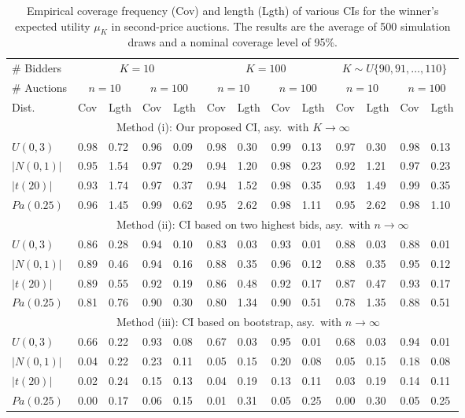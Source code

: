 \begin{table}[ht]
\centering
\renewcommand{\arraystretch}{1.4}%
\begin{tabular}{lllllllllllll}
\hline\hline
\# Bidders & \multicolumn{4}{c}{$K=10$} & \multicolumn{4}{c}{$K=100$} & \multicolumn{4}{c}{$K \sim U\{90,91,\dots,110\}$} \\ 
\# Auctions & \multicolumn{2}{c}{$n=10$} & \multicolumn{2}{c}{$n=100$} & \multicolumn{2}{c}{$n=10$} & \multicolumn{2}{c}{$n=100$} & \multicolumn{2}{c}{$n=10$} & \multicolumn{2}{c}{$n=100$} \\ \hline
Dist.\ & Cov & Lgth & Cov & Lgth & Cov & Lgth & Cov & Lgth & Cov & Lgth & Cov & Lgth \\ \hline
\multicolumn{13}{l}{~~~~~~~~~~~~~~~~~~~Method (i): Our proposed CI, asy.\ with $K\to\infty$} \\ 
$U(0,3)$               & 0.98 & 0.72 & 0.96 & 0.09 & 0.98 & 0.30 & 0.99 & 0.13 & 0.97 & 0.30 & 0.98	& 0.13 \\
{$\vert N(0,1) \vert$} & 0.95 & 1.54 & 0.97 & 0.29 & 0.94 & 1.20 & 0.98 & 0.23 & 0.92 & 1.21 & 0.97 & 0.23 \\ 
{$\vert t(20) \vert$}  & 0.93 & 1.74 & 0.97 & 0.37 & 0.94 & 1.52 & 0.98 & 0.35 & 0.93 & 1.49 & 0.99 & 0.35 \\ 
$Pa(0.25) $            & 0.96 & 1.45 & 0.99 & 0.62 & 0.95 & 2.62 & 0.98 & 1.11 & 0.95 & 2.62 & 0.98 & 1.10 \\ 
 \hline
\multicolumn{13}{l}{~~~~~~~~~~~~~~~~~~~Method (ii): CI based on two highest bids, asy.\ with $n\to\infty$} \\  
$U(0,3)$               & 0.86 & 0.28 & 0.94 & 0.10 & 0.83 & 0.03 & 0.93 & 0.01 & 0.88 & 0.03 & 0.88 & 0.01 \\
{$\vert N(0,1) \vert$} & 0.89 & 0.46 & 0.94 & 0.16 & 0.88 & 0.35 & 0.96 & 0.12 & 0.88 & 0.35 & 0.95 & 0.12 \\ 
{$\vert t(20) \vert$}  & 0.89 & 0.55 & 0.92 & 0.19 & 0.86 & 0.48 & 0.92 & 0.17 & 0.87 & 0.47 & 0.93 & 0.17 \\ 
$Pa(0.25) $            & 0.81 & 0.76 & 0.90 & 0.30 & 0.80 & 1.34 & 0.90 & 0.51 & 0.78 & 1.35 & 0.88 & 0.51 \\ 
 \hline
\multicolumn{13}{l}{~~~~~~~~~~~~~~~~~~~Method (iii): CI based on bootstrap, asy.\ with $n\to\infty$} \\  
$U(0,3)$               & 0.66 & 0.22 & 0.93 & 0.08 & 0.67 & 0.03 & 0.95 & 0.01 & 0.68 & 0.03 & 0.94 & 0.01 \\
{$\vert N(0,1) \vert$} & 0.04 & 0.22 & 0.23 & 0.11 & 0.05 & 0.15 & 0.20 & 0.08 & 0.05 & 0.15 & 0.18 & 0.08 \\ 
{$\vert t(20) \vert$}  & 0.02 & 0.24 & 0.15 & 0.13 & 0.04 & 0.19 & 0.13 & 0.11 & 0.03 & 0.19 & 0.14 & 0.11 \\ 
$Pa(0.25) $            & 0.00 & 0.17 & 0.06 & 0.15 & 0.01 & 0.31 & 0.05 & 0.25 & 0.00 & 0.30 & 0.05	& 0.25 \\ 
\hline\hline
\end{tabular}
\caption{Empirical coverage frequency (Cov) and length (Lgth) of various CIs for the winner's expected utility $\mu_K$ in second-price auctions. The results are the average of 500 simulation draws and a nominal coverage level of 95\%.}\label{tbl:sp-CI}
\end{table}
